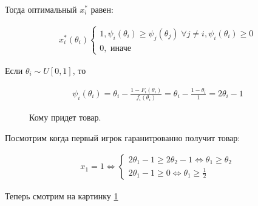 \begin{exmpl}
Тогда оптимальный $x_i^*$ равен:

 \begin{align*}
	x_i^*(\theta_i) \begin{cases}
		1, \psi_i(\theta_i) \geqslant \psi_j (\theta_j) \; \forall j \neq i, \psi_i(\theta_i) \geqslant 0 \\
		0, \text{ иначе }
	\end{cases}
\end{align*}

Если $\theta_i \sim U[0, 1]$, то 

\begin{align*}
	\psi_i(\theta_i) = \theta_i - \frac{1 - F_i(\theta_i)}{f_i(\theta_i)} = \theta_i - \frac{1 - \theta_i}{1} = 2\theta_i - 1
\end{align*}

\begin{figure}[ht]
    \centering
    \caption{Кому придет товар.}
    \label{fig:rasp_theorem_lec3}
\end{figure}

Посмотрим когда первый игрок гаранитрованно получит товар:

\begin{align*}
	x_1 = 1 \iff \begin{cases} 2 \theta_1 - 1 \geqslant 2 \theta_2 - 1 \iff \theta_1 \geqslant \theta_2 \\ 2 \theta_1 - 1 \geqslant 0 \iff \theta_1 \geqslant \frac{1}{2} \end{cases}
\end{align*}

Теперь смотрим на картинку \ref{fig:rasp_theorem_lec3}


\end{exmpl}
